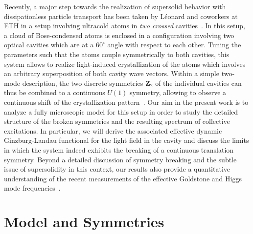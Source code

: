 \documentclass[12pt]{iopart}
\begin{document}
Recently, a major step towards the realization of supersolid behavior with dissipationless particle transport 
has been taken by L\'eonard and coworkers at ETH in a setup involving ultracold atoms 
in \emph{two crossed} cavities~\cite{leonard2016supersolid}. In this setup,
a cloud of Bose-condensed atoms is enclosed in a configuration involving two optical cavities which
are at a $60^\circ$ angle with respect to each other. Tuning the parameters such that the atoms
couple symmetrically to both cavities, this system allows to realize light-induced crystallization of
the atoms which involves an arbitrary superposition of both cavity wave vectors. Within a simple 
two-mode description, the two discrete symmetries $\mathbf{Z}_2$ of the individual cavities can 
thus be combined to a continuous $U(1)$ symmetry, allowing to observe a continuous shift of 
the crystallization pattern~\cite{leonard2016supersolid}. 
Our aim in the present work is to 
analyze a fully microscopic model for this setup in order to study the detailed 
structure of the broken symmetries and the resulting spectrum of collective 
excitations. In particular, we will derive the associated effective dynamic Ginzburg-Landau functional 
for the light field in the cavity and discuss the limits in which the system indeed exhibits
the breaking of a continuous translation symmetry. Beyond a detailed discussion of 
symmetry breaking and the subtle issue of supersolidity in this context, our results also 
provide a quantitative understanding of the recent measurements of the effective 
Goldstone and Higgs mode frequencies~\cite{leonard_supersolid_goldstone}.          

             

\section{Model and Symmetries}
\label{sec:symmetries}
\end{document}

